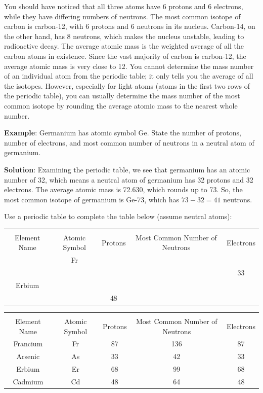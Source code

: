 You should have noticed that all three atoms have 6 protons and 6 electrons,
while they have differing numbers of neutrons. The most common isotope of carbon
is carbon-12, with 6 protons and 6 neutrons in its nucleus. Carbon-14, on the
other hand, has 8 neutrons, which makes the nucleus unstable, leading to
radioactive decay. The average atomic mass
is the weighted average of all the carbon atoms in existence. Since the vast
majority of carbon is carbon-12, the average atomic mass is very close to 12.
You cannot determine the mass number of an individual atom from the periodic
table; it only tells you the average of all the isotopes. However, especially
for light atoms (atoms in the first two rows of the periodic table), you can
usually determine the mass number of the most common isotope by rounding the
average atomic mass to the nearest whole number.

\textbf{Example}: Germanium has atomic symbol Ge. State the number of protons,
number of electrons, and most common number of neutrons in a neutral atom of
germanium.

\textbf{Solution}: Examining the periodic table, we see that germanium has an
atomic number of 32, which means a neutral atom of germanium has 32 protons and
32 electrons. The average atomic mass is 72.630, which rounds up to 73. So, the
most common isotope of germanium is Ge-73, which has $73 - 32 = 41$ neutrons.

\begin{Exercise}[title = {Determining Numbers of Subatomic Particles}, label = pne]
Use a periodic table to complete the table below (assume neutral atoms): %

\begin{tabular}{|c|c|c|c|c|}
\hline\\
Element Name & Atomic Symbol & Protons & Most Common Number of Neutrons & Electrons\\\hline
 & Fr & & & \\\hline
 & & & & 33\\\hline
 Erbium & & & & \\\hline
  & & 48 & & \\\hline
\end{tabular}
\end{Exercise}

\begin{Answer}[ref = pne]
\begin{tabular}{|c|c|c|c|c|}
\hline\\
Element Name & Atomic Symbol & Protons & Most Common Number of Neutrons & Electrons\\\hline
 Francium & Fr & 87 & 136 & 87 \\\hline
 Arsenic & As & 33 & 42 & 33 \\\hline
 Erbium & Er & 68 & 99 & 68 \\\hline
 Cadmium & Cd & 48 & 64 & 48 \\\hline
\end{tabular}
\end{Answer}





